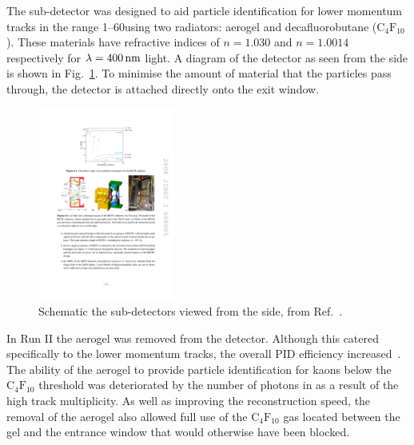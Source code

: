 



\subsubsection{\richone}
The \richone sub-detector was designed to aid particle identification for lower momentum tracks in the range 1--60\gevc using two radiators: aerogel and decafluorobutane ($\text{C}_{4}\text{F}_{10}$). These materials have refractive indices of $n = 1.030$ and $n = 1.0014$ respectively for $\lambda = 400\mathrm{ \,nm}$ light. A diagram of the \richone detector as seen from the side is shown in Fig.~\ref{fig:Dec_richone_layout}. To minimise the amount of material that the particles pass through, the \richone detector is attached directly onto the \velo exit window.  

\begin{figure}[!h]
    \centering        
    \includegraphics[width=0.4\textwidth]{figs/Detector/richone_layout.pdf}
    \caption{Schematic the \richone sub-detectors viewed from the side, from Ref.~\cite{Alves:2008zz}.}
    \label{fig:Dec_richone_layout}   
\end{figure}

In Run II the aerogel was removed from the \richone detector. Although this catered specifically to the lower momentum tracks, the overall PID efficiency increased~\cite{PAPANESTIS2017221}. The ability of the aerogel to provide particle identification for kaons below the $\text{C}_{4}\text{F}_{10}$ threshold was deteriorated by the number of photons in \richone as a result of the high track multiplicity. As well as improving the reconstruction speed, the removal of the aerogel also allowed full use of the $\text{C}_{4}\text{F}_{10}$ gas located between the gel and the \velo entrance window that would otherwise have been blocked. 

